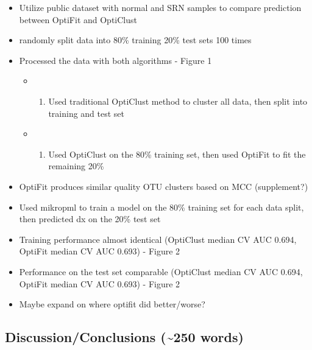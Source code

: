 \documentclass[
  11pt,
]{article}
\providecommand{\tightlist}{%
  \setlength{\itemsep}{0pt}\setlength{\parskip}{0pt}}
\begin{document}
\begin{itemize}
\tightlist
\item
  Utilize public dataset with normal and SRN samples to compare
  prediction between OptiFit and OptiClust
\item
  randomly split data into 80\% training 20\% test sets 100 times
\item
  Processed the data with both algorithms - Figure 1

  \begin{itemize}
  \item
    \begin{enumerate}
    \def\labelenumi{\arabic{enumi}.}
    \tightlist
    \item
      Used traditional OptiClust method to cluster all data, then split
      into training and test set
    \end{enumerate}
  \item
    \begin{enumerate}
    \def\labelenumi{\arabic{enumi}.}
    \setcounter{enumi}{1}
    \tightlist
    \item
      Used OptiClust on the 80\% training set, then used OptiFit to fit
      the remaining 20\%
    \end{enumerate}
  \end{itemize}
\item
  OptiFit produces similar quality OTU clusters based on MCC
  (supplement?)
\item
  Used mikropml to train a model on the 80\% training set for each data
  split, then predicted dx on the 20\% test set
\item
  Training performance almost identical (OptiClust median CV AUC 0.694,
  OptiFit median CV AUC 0.693) - Figure 2
\item
  Performance on the test set comparable (OptiClust median CV AUC 0.694,
  OptiFit median CV AUC 0.693) - Figure 2
\item
  Maybe expand on where optifit did better/worse?
\end{itemize}

\hypertarget{discussionconclusions-250-words}{%
\subsection{Discussion/Conclusions (\textasciitilde250
words)}\label{discussionconclusions-250-words}}
\end{document}
